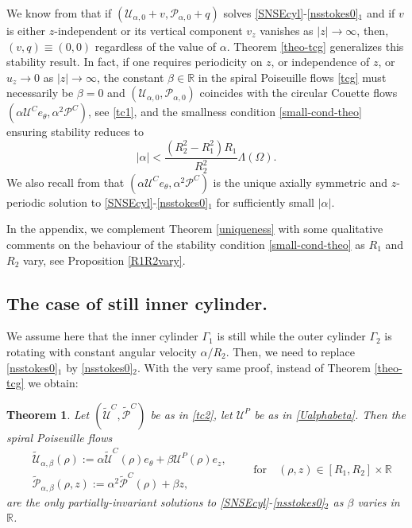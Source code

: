 \documentclass[a4paper,11pt]{amsart}
\newtheorem{theorem}{Theorem}[section]
\numberwithin{equation}{section}
\numberwithin{figure}{section}
\def\U{{\mathcal U}}
\def\P{{\mathcal P}}
\begin{document}
	We know from \cite[p.226]{temam2001navier} that if $( \U_{\alpha,0}+v,  \P_{\alpha,0}+q)$  solves \eqref{SNSEcyl}-\eqref{nsstokes0}$_1$
	and if $v$ is either $z$-independent or its vertical component $v_z$ vanishes
	as $|z|\to\infty$, then, $(v,q)\equiv(0,0)$ regardless of the value of $\alpha$. Theorem \ref{theo-tcg} generalizes this stability result. In fact, if one requires periodicity on $z$, or independence of $z$, or $u_z\rightarrow 0$ as $|z|\to\infty$, the constant $\beta\in \mathbb{R}$ in the
	spiral Poiseuille flows \eqref{tcg} must necessarily be $\beta=0$ and $( \U_{\alpha,0},  \P_{\alpha, 0})$ coincides with the circular Couette flows $(\alpha{\mathcal U^C}e_\theta,\alpha^2{\P^C})$, see \eqref{tc1}, and the smallness condition
	\eqref{small-cond-theo} ensuring stability reduces to
	\begin{equation*}
		|\alpha| < \frac{(R_2^2-R_1^2)R_1}{R_2^2}\Lambda(\Omega).
	\end{equation*}
	We also recall from \cite{temam2001navier,zeidlerIV} that $(\alpha{\mathcal U}^Ce_\theta,\alpha^2{\P^C})$ is the unique axially symmetric and $z$-periodic solution to \eqref{SNSEcyl}-\eqref{nsstokes0}$_1$ for sufficiently small $|\alpha|$.
	
	In the appendix, we complement Theorem \ref{uniqueness} with some qualitative comments on the behaviour of the stability condition \eqref{small-cond-theo} as $R_1$ and $R_2$ vary, see Proposition \ref{R1R2vary}.
	
	\subsection{The case of still inner cylinder.}\label{sec:velocityoutercylinder}
	
	We assume here that the inner cylinder $\Gamma_1$ is still while the outer cylinder $\Gamma_2$ is rotating with constant angular velocity
	$\alpha/R_2$. Then, we need to replace \eqref{nsstokes0}$_1$ by \eqref{nsstokes0}$_2$.
	With the very same proof, instead of Theorem \ref{theo-tcg} we obtain:
	
	\begin{theorem}\label{theo-tcg2}
		Let $({\widetilde\U^C},{\widetilde\P^C})$ be as in \eqref{tc2}, let $\U^P$ be as in \eqref{Ualphabeta}. Then the spiral Poiseuille flows
		\begin{equation} \label{tcg2}
			\begin{aligned}
				&\widetilde\U_{\alpha,\beta}(\rho) := \alpha\widetilde\U^C(\rho)e_\theta+ \beta\U^P(\rho)e_z ,\\[5pt]
				& \widetilde\P_{\alpha,\beta}(\rho,z) := \alpha^2\widetilde\P^C(\rho)+ \beta z,\end{aligned}  \qquad \text{for} \quad  (\rho, z)\in [R_1,R_2]\times \mathbb{R}\,
		\end{equation}
		are the only partially-invariant solutions  to \eqref{SNSEcyl}-\eqref{nsstokes0}$_2$ as $ \beta$ varies in $\mathbb{R}$.
	\end{theorem}
	
\end{document}
